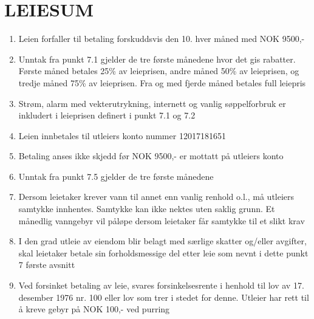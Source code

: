 \section{LEIESUM}


	\begin{enumerate}


        \item Leien forfaller til betaling forskuddsvis den 10. hver måned med NOK 9500,-

		\item Unntak fra punkt 7.1 gjelder de tre første månedene hvor det gis rabatter. Første måned betales 25\% av leieprisen, andre måned 50\% av leieprisen, og tredje måned 75\% av leieprisen. Fra og med fjerde måned betales full leiepris

		\item Strøm, alarm med vekterutrykning, internett og vanlig søppelforbruk er inkludert i leieprisen definert i punkt 7.1 og 7.2

        \item Leien innbetales til utleiers konto nummer 12017181651

		\item Betaling anses ikke skjedd før NOK 9500,- er mottatt på utleiers konto

		\item Unntak fra punkt 7.5 gjelder de tre første månedene

		\item Dersom leietaker krever vann til annet enn vanlig renhold o.l., må utleiers
        samtykke innhentes. Samtykke kan ikke nektes uten saklig grunn. Et månedlig vanngebyr vil påløpe dersom leietaker får samtykke til et slikt krav

		\item I den grad utleie av eiendom blir belagt med særlige skatter og/eller avgifter, skal leietaker betale sin
        forholdsmessige del etter leie som nevnt i dette punkt 7 første avsnitt

		\item Ved forsinket betaling av leie, svares forsinkelsesrente i henhold til lov av 17. desember 1976 nr. 100 eller lov som trer i stedet for denne. Utleier har rett til å kreve gebyr på NOK 100,- ved purring


	\end{enumerate}
